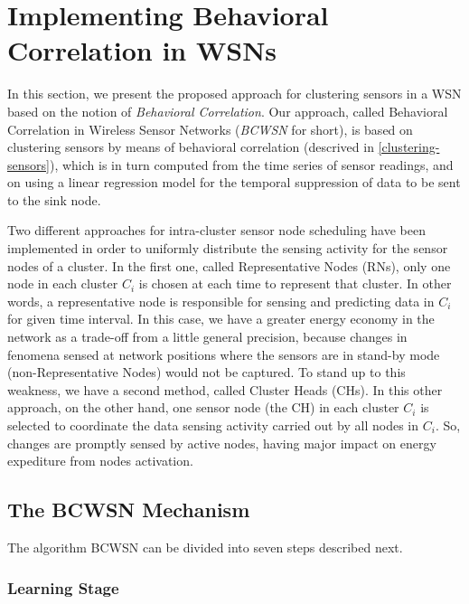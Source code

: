 \documentclass[conference]{IEEEtran}
\begin{document}
\section{Implementing Behavioral Correlation in WSNs}
\label{implementing-bcwsn}

In this section, we present the proposed approach for clustering sensors in a
WSN based on the notion of {\it Behavioral Correlation}. Our approach, called
Behavioral Correlation in Wireless Sensor Networks (\textit{BCWSN} for short),
is based on clustering sensors by means of behavioral correlation (descrived in
\ref{clustering-sensors}), which is in turn computed from the time series of
sensor readings, and on using a linear regression model for the temporal
suppression of data to be sent to the sink node.

Two different approaches for intra-cluster sensor node scheduling have been
implemented in order to uniformly distribute the sensing activity for the
sensor nodes of a cluster. In the first one, called Representative Nodes (RNs),
only one node in each cluster $C_{i}$ is chosen at each time to represent that
cluster. In other words, a representative node is responsible for sensing and
predicting data in $C_{i}$ for given time interval. In this case, we have a
greater energy economy in the network as a trade-off from a little
general precision, because changes in fenomena sensed at network positions where
the sensors are in stand-by mode (non-Representative Nodes) would not be
captured. To stand up to this weakness, we have a second method, called
Cluster Heads (CHs). In this other approach, on the other hand, one sensor node
(the CH) in each cluster $C_{i}$ is selected to coordinate the data sensing
activity carried out by all nodes in $C_{i}$. So, changes are promptly sensed by
active nodes, having major impact on energy expediture from nodes activation.

\subsection{The BCWSN Mechanism}


The algorithm BCWSN can be divided into seven steps described next.


\subsubsection{Learning Stage}
\end{document}
